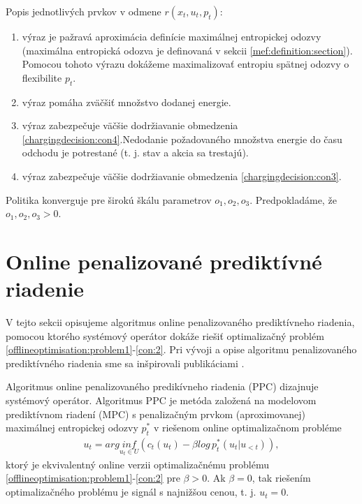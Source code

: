 Popis jednotlivých prvkov v odmene $r(x_{t}, u_{t}, p_{t})$:
\begin{enumerate}
    \item výraz je pažravá aproximácia definície maximálnej entropickej odozvy (maximálna entropická odozva je definovaná v sekcii \ref{mef:definition:section}). Pomocou tohoto výrazu dokážeme maximalizovať entropiu spätnej odozvy o flexibilite $p_{t}$.
    \item výraz pomáha zväčšiť množstvo dodanej energie.
    \item výraz zabezpečuje väčšie dodržiavanie obmedzenia \eqref{chargingdecision:con4}.Nedodanie požadovaného množstva energie do času odchodu je potrestané (t. j. stav a akcia sa trestajú).
    \item výraz zabezpečuje väčšie dodržiavanie obmedzenia \eqref{chargingdecision:con3}. 
\end{enumerate}
Politika  konverguje pre širokú škálu parametrov $o_{1}, o_{2}, o_{3}$. Predpokladáme, že $o_{1}, o_{2}, o_{3} > 0$.



\section{Online penalizované prediktívné riadenie}
\label{PPC:online:section}
V tejto sekcii opisujeme algoritmus online penalizovaného prediktívneho riadenia, pomocou ktorého systémový operátor dokáže riešiť optimalizačný problém \eqref{offlineoptimisation:problem1}-\eqref{con:2}.
Pri vývoji a opise algoritmu penalizovaného prediktívného riadenia sme sa inšpirovali publikáciami \cite{Li_2021,Li_information_aggregation}. 




Algoritmus online penalizovaného predikívneho riadenia (PPC) dizajnuje systémový operátor. Algoritmus PPC je metóda založená na modelovom prediktívnom riadení (MPC) s penalizačným prvkom (aproximovanej) maximálnej entropickej odozvy $p^{*}_{t}$ v riešenom online optimalizačnom probléme
\begin{gather}
    \label{PPC:onlineopt}
    u_{t}  = arg \underset{u_{t} \in U}{inf} (c_{t}(u_{t})  -  \beta log \, p^{*}_{t}  (u_{t} | u_{<t})),
\end{gather}
ktorý je ekvivalentný online verzii optimalizačnému problému \eqref{offlineoptimisation:problem1}-\eqref{con:2} pre $\beta > 0$. Ak $\beta = 0$, tak riešením optimalizačného problému je signál s najnižšou cenou, t. j. $u_{t} = 0$. 


